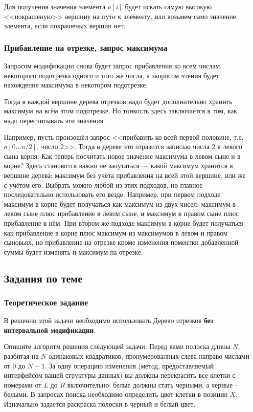 Для получения значения элемента $a[i]$ будет искать самую высокую <<покрашеную>> вершину на пути к элементу, или возьмем само значение элемента, если покрашеных вершин нет.

\subsubsection{Прибавление на отрезке, запрос максимума}
Запросом модификации снова будет запрос прибавления ко всем числам некоторого подотрезка одного и того же числа, а запросом чтения будет нахождение максимума в некотором подотрезке.

Тогда в каждой вершине дерева отрезков надо будет дополнительно хранить максимум на всём этом подотрезке. Но тонкость здесь заключается в том, как надо пересчитывать эти значения.

Например, пусть произошёл запрос <<прибавить ко всей первой половине, т.е. $a[0 \ldots n/2]$, число 2>>. Тогда в дереве это отразится записью числа 2 в левого сына корня. Как теперь посчитать новое значение максимума в левом сыне и в корне? Здесь становится важно не запутаться — какой максимум хранится в вершине дерева: максимум без учёта прибавления на всей этой вершине, или же с учётом его. Выбрать можно любой из этих подходов, но главное — последовательно использовать его везде. Например, при первом подходе максимум в корне будет получаться как максимум из двух чисел: максимум в левом сыне плюс прибавление в левом сыне, и максимум в правом сыне плюс прибавление в нём. При втором же подходе максимум в корне будет получаться как прибавление в корне плюс максимум из максимумов в левом и правом сыновьях, но прибавление на отрезке кроме изменения поментки добавленной суммы будет изменять и максимум на отрезке.

\subsection{Задания по теме}
\subsubsection{Теоретическое задание}
В решении этой задачи необходимо использовать Дерево отрезков
\textbf{без интервальной модификации}.

Опишите алгоритм решения следующей задачи.
Перед вами полоска длины $N$, разбитая на $N$ одинаковых квадратиков, пронумерованных слева направо числами от 0 до $N-1$. За одну операцию изменения (метод, предоставляемый интерфейсом вашей структуры данных) вы должны перекрасить все клетки с номерами от $L$ до $R$ включительно:
белые должны стать черными, а черные - белыми. В запросах поиска необходимо определить цвет клетки в позиции $X$. Изначально задается раскраска полоски в черный и белый цвет.

